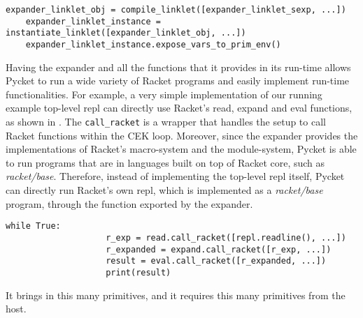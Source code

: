 			\begin{center}
				\begin{minipage}{0.7\textwidth}
					\begin{lstlisting}[style=inline-python,frame=lines,numbers=none]
	expander_linklet_obj = compile_linklet([expander_linklet_sexp, ...])
	expander_linklet_instance = instantiate_linklet([expander_linklet_obj, ...])
	expander_linklet_instance.expose_vars_to_prim_env()\end{lstlisting}
				\end{minipage}
			\end{center}

			\begin{paragraph-here}%
				Having the expander and all the functions that it provides in its
				run-time allows Pycket to run a wide variety of Racket programs and
				easily implement run-time functionalities. For example, a very simple
				implementation of our running example top-level repl can directly use
				Racket's read, expand and eval functions, as shown in
				. The \verb|call_racket| is a wrapper that
				handles the setup to call Racket functions within the CEK loop.
				Moreover, since the expander provides the implementations of Racket's
				macro-system and the module-system, Pycket is able to run programs
				that are in languages built on top of Racket core, such as
				\emph{racket/base}. Therefore, instead of implementing the top-level
				repl itself, Pycket can directly run Racket's own repl, which is
				implemented as a \emph{racket/base} program, through the
				 function exported by the expander.
			\end{paragraph-here}

			\begin{center}
				\begin{minipage}{0.6\textwidth}
					\begin{lstlisting}[style=inline-python,frame=lines,numbers=none]
				while True:
					r_exp = read.call_racket([repl.readline(), ...])
					r_expanded = expand.call_racket([r_exp, ...])
					result = eval.call_racket([r_expanded, ...])
					print(result)\end{lstlisting}
				\end{minipage}
			\end{center}

			\begin{paragraph-here}%
				It brings in this many primitives, and it requires this many primitives from the host.
			\end{paragraph-here}

